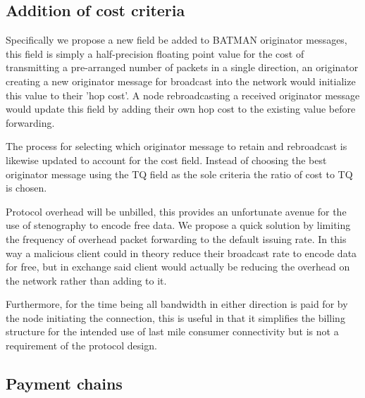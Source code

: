 \documentclass[11pt]{article}
\begin{document}
	\subsection{Addition of cost criteria}

		Specifically we propose a new field be added to BATMAN originator messages, this field is simply a half-precision floating point value for the cost of transmitting a pre-arranged number of packets in a single direction, an originator creating a new originator message for broadcast into the network would initialize this value to their 'hop cost'. A node rebroadcasting a received originator message would update this field by adding their own hop cost to the existing value before forwarding.

	        The process for selecting which originator message to retain and rebroadcast is likewise updated to account for the cost field. Instead of choosing the best originator message using the TQ field as the sole criteria the ratio of cost to TQ is chosen.

                Protocol overhead will be unbilled, this provides an unfortunate avenue for the use of stenography to encode free data. We propose a quick solution by limiting the frequency of overhead packet forwarding to the default issuing rate. In this way a malicious client could in theory reduce their broadcast rate to encode data for free, but in exchange said client would actually be reducing the overhead on the network rather than adding to it.

                Furthermore, for the time being all bandwidth in either direction is paid for by the node initiating the connection, this is useful in that it simplifies the billing structure for the intended use of last mile consumer connectivity but is not a requirement of the protocol design.

	\subsection{Payment chains} \label{paychains}
\end{document}
